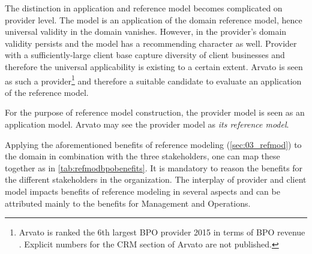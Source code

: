 The distinction in application and reference model becomes complicated on provider level. The model is an application of the domain reference model, hence universal validity in the domain vanishes. However, in the provider's domain validity persists and the model has a recommending character as well. Provider with a sufficiently-large client base capture diversity of client businesses and therefore the universal applicability is existing to a certain extent. Arvato is seen as such a provider\footnote{Arvato is ranked the 6th largest BPO provider 2015 in terms of BPO revenue \citep{hfs2016top}. Explicit numbers for the CRM section of Arvato are not published.} and therefore a suitable candidate to evaluate an application of the reference model. 

For the purpose of reference model construction, the provider model is seen as an application model. Arvato may see the provider model as \textit{its reference model}.

Applying the aforementioned benefits of reference modeling (\cf \ref{sec:03_refmod}) to the domain in combination with the three stakeholders, one can map these together as in \Tab \ref{tab:refmodbpobenefits}. It is mandatory to reason the benefits for the different stakeholders in the organization. The interplay of provider and client model impacts benefits of reference modeling in several aspects and can be attributed mainly to the benefits for Management and Operations.


